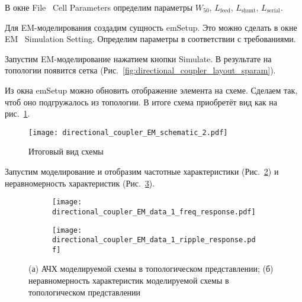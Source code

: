 В окне File \textrightarrow\ Cell Parameters определим параметры $W_{50}$, $L_\text{feed}$, $L_\text{shunt}$, $L_\text{serial}$.

Для EM-моделирования создадим сущность emSetup.
Это можно сделать в окне EM \textrightarrow\ Simulation Setting.
Определим параметры в соответствии с требованиями.

Запустим EM-моделирование нажатием кнопки Simulate.
В результате на топологии появится сетка (Рис.~\ref{fig:directional_coupler_layout_sparam}).

Из окна emSetup можно обновить отображение элемента на схеме.
Сделаем так, чтоб оно подгружалось из топологии.
В итоге схема приобретёт вид как на рис.~\ref{fig:directional_coupler_EM_schematic_2}.

\begin{figure}[!ht]
    \centering
    \texttt{[image: directional\_coupler\_EM\_schematic\_2.pdf]}
    \caption{Итоговый вид схемы}%
    \label{fig:directional_coupler_EM_schematic_2}
\end{figure}

Запустим моделирование и отобразим частотные характеристики (Рис.~\ref{fig:directional_coupler_EM_data_1_freq_response}) и неравномерность характеристик (Рис.~\ref{fig:directional_coupler_EM_data_1_ripple_response}).

\begin{figure}[!ht]
    \begin{subfigure}[b]{0.45\textwidth}
        \centering
        \texttt{[image: directional\_coupler\_EM\_data\_1\_freq\_response.pdf]}
        \caption{}%
        \label{fig:directional_coupler_EM_data_1_freq_response}
    \end{subfigure}
    \hfill
    \begin{subfigure}[b]{0.45\textwidth}
        \centering
        \texttt{[image: directional\_coupler\_EM\_data\_1\_ripple\_response.pdf]}
        \caption{}%
        \label{fig:directional_coupler_EM_data_1_ripple_response}
    \end{subfigure}
    \caption{%
        (а) АЧХ моделируемой схемы в топологическом представлении;
        (б) неравномерность характеристик моделируемой схемы в топологическом представлении
    }%
    \label{fig:directional_coupler_EM_data_1}
\end{figure}
